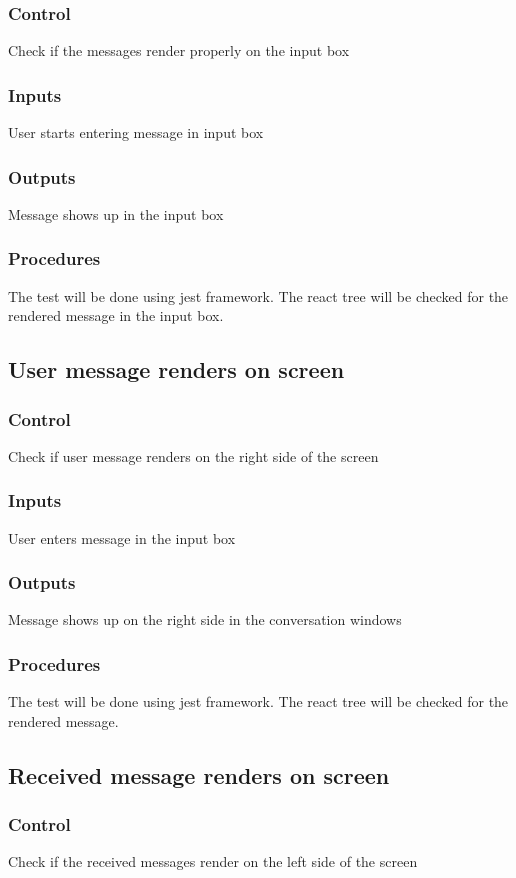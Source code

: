 \documentclass[12pt, titlepage]{article}
\begin{document}
\subsubsection{Control}
Check if the messages render properly on the input box
\subsubsection{Inputs}
User starts entering message in input box
\subsubsection{Outputs}
Message shows up in the input box
\subsubsection{Procedures}
The test will be done using jest framework. The react tree will be checked for the rendered message in the input box.
\subsection{User message renders on screen}
\subsubsection{Control}
Check if user message renders on the right side of the screen
\subsubsection{Inputs}
User enters message in the input box
\subsubsection{Outputs}
Message shows up on the right side in the conversation windows
\subsubsection{Procedures}
The test will be done using jest framework. The react tree will be checked for the rendered message.
\subsection{Received message renders on screen}
\subsubsection{Control}
Check if the received messages render on the left side of the screen
\end{document}

